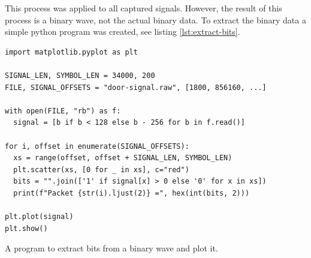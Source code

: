 This process was applied to all captured signals. However, the result of this process is a binary wave, not the actual binary data. To extract the binary data a simple python program was created, see listing \ref{lst:extract-bits}.
\begin{listing}[ht]
    \begin{verbatim}
import matplotlib.pyplot as plt

SIGNAL_LEN, SYMBOL_LEN = 34000, 200
FILE, SIGNAL_OFFSETS = "door-signal.raw", [1800, 856160, ...]

with open(FILE, "rb") as f:
  signal = [b if b < 128 else b - 256 for b in f.read()]

for i, offset in enumerate(SIGNAL_OFFSETS):
  xs = range(offset, offset + SIGNAL_LEN, SYMBOL_LEN)
  plt.scatter(xs, [0 for _ in xs], c="red")
  bits = "".join(['1' if signal[x] > 0 else '0' for x in xs])
  print(f"Packet {str(i).ljust(2)} =", hex(int(bits, 2)))

plt.plot(signal)
plt.show()
    \end{verbatim}
    \caption{A program to extract bits from a binary wave and plot it.}
    \label{lst:extract-bits}
\end{listing}

